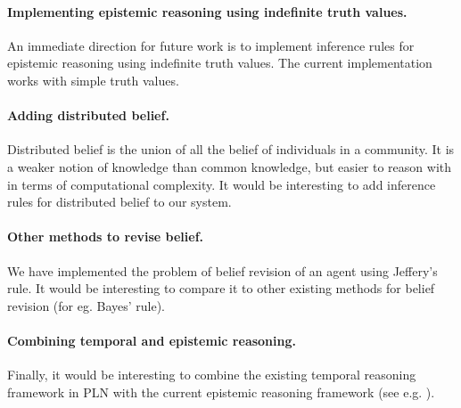 \documentclass[12pt]{article}
\begin{document}
\paragraph{Implementing epistemic reasoning using indefinite truth values.} An immediate direction for future work is to implement inference rules for epistemic reasoning using indefinite truth values. The current implementation works with simple truth values.


\paragraph{Adding distributed belief.} Distributed belief is the union of all the belief of individuals in a community. It is a weaker notion of knowledge than common knowledge, but easier to reason with in terms of computational complexity. It would be interesting to add inference rules for distributed belief to our system.


\paragraph{Other methods to revise belief.} We have implemented the problem of belief revision of an agent using Jeffery's rule. It would be interesting to compare it to other existing methods for belief revision  (for eg. Bayes' rule). 

\paragraph{Combining temporal and epistemic reasoning.} Finally, it would be interesting to combine the existing temporal reasoning framework in PLN with the current epistemic reasoning framework (see e.g. \cite{Hoekwooldridge}). 

\paragraph{}


\end{document}
